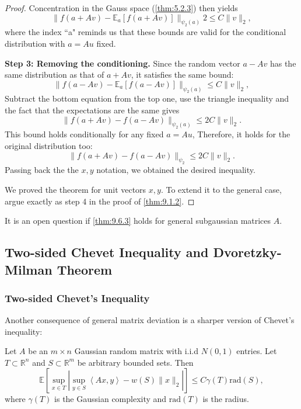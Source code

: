 \begin{proof}
Concentration in the Gauss space (\cref{thm:5.2.3}) then yields 
\[ \lVert f(a + Av) - \mathbb{E}_a\left[ f(a + Av) \right] \rVert_{\psi_2(a)}2 \leq C \lVert v \rVert_{2}, \]
where the index ``a" reminds us that these bounds are valid for the conditional distribution with $a = Au$ fixed.

\textbf{Step 3: Removing the conditioning.} Since the random vector $a - Av$ has the same distribution as that 
of $a + Av$, it satisfies the same bound:
\[ \lVert f(a - Av) - \mathbb{E}_a\left[ f(a - Av) \right] \rVert_{\psi_2(a)} \leq C \lVert v \rVert_{2}, \]
Subtract the bottom equation from the top one, use the triangle inequality and the fact that the expectations 
are the same gives 
\[ \lVert f(a + Av) - f(a - Av) \rVert_{\psi_2(a)} \leq 2 C \lVert v \rVert_{2}. \]
This bound holds conditionally for any fixed $a = Au$, Therefore, it holds for the original distribution too:
\[ \lVert f(a + Av) - f(a - Av) \rVert_{\psi_2} \leq 2 C \lVert v \rVert_{2}. \]
Passing back the the $x, y$ notation, we obtained the desired inequality.

We proved the theorem for unit vectors $x, y$. To extend it to the general case, argue exactly as step 4 in the 
proof of \cref{thm:9.1.2}.
\end{proof}

\begin{remark}[]
\label{rmk:9.6.5}
It is an open question if \cref{thm:9.6.3} holds for general subgaussian matrices $A$.
\end{remark}



\subsection{Two-sided Chevet Inequality and Dvoretzky-Milman Theorem}


\subsubsection{Two-sided Chevet's Inequality}
Another consequence of general matrix deviation is a sharper version of Chevet's inequality:

\begin{theorem}
\label{thm:9.7.1}
Let $A$ be an $m \times n$ Gaussian random matrix with i.i.d $N(0, 1)$ entries. Let $T \subset \mathbb{R}^n$ and 
$S \subset \mathbb{R}^m$ be arbitrary bounded sets. Then 
\[ \mathbb{E}\left[ \sup_{x \in T} \left| \sup_{y \in S}\left\langle Ax, y \right\rangle - w(S) \lVert x 
\rVert_{2} \right| \right] \leq C \gamma(T) \mathrm{rad}(S), \]
where $\gamma(T)$ is the Gaussian complexity and $\mathrm{rad}(T)$ is the radius.
\end{theorem}

